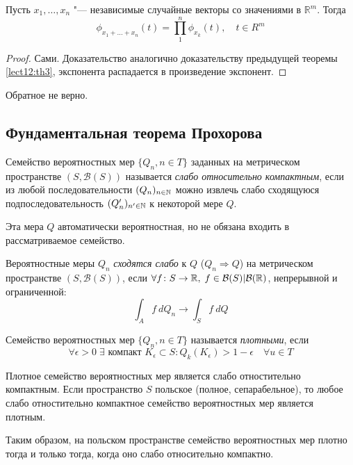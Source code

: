 \begin{lemma} \label{lect12:lem2}
    Пусть $x_1, \ldots, x_n$ "--- независимые случайные векторы со значениями в $\mathbb{R}^{m}$. Тогда
    $$\phi_{x_1 + \ldots + x_n} (t) = \prod_1^n \phi_{x_k}(t) , \quad t \in R^m$$
\end{lemma}
\begin{proof}
    Сами. Доказательство аналогично доказательству предыдущей теоремы \ref{lect12:th3}, экспонента распадается в произведение экспонент.
\end{proof}
\begin{nb}
    Обратное не верно.
\end{nb}
\subsection{Фундаментальная теорема Прохорова}
\begin{definition} \label{lect12:def2}
    Семейство вероятностных мер $\{Q_n, n \in T\}$ заданных на метрическом пространстве $(S, \mathcal{B}(S))$ называется \emph{слабо относительно компактным}, если из любой последовательности $(Q_n)_{n\in\mathbb{N}}$ можно извлечь слабо сходящуюся подпоследовательность $(Q_n')_{n'\in\mathbb{N}}$ к некоторой мере $Q$.
\end{definition}
\begin{nb}
    Эта мера $Q$ автоматически вероятностная, но не обязана входить в рассматриваемое семейство.
\end{nb}
\begin{definition} \label{lect12:def3}
    Вероятностные меры $Q_n$ \emph{сходятся слабо} к $Q$ ($Q_n \Rightarrow Q$) на метрическом пространстве $(S, \mathcal{B}(S))$, если
    $\forall f\colon S\to\mathbb{R}, \; f\in \mathcal{B}(S) | \mathcal{B}(\mathbb{R})$, непрерывной и ограниченной:
    $$\int_A f\: dQ_n \to \int_S f\:dQ$$
\end{definition}
\begin{definition} \label{lect12:def4}
    Семейство вероятностных мер $\{Q_n, n \in T\}$ называется \emph{плотными}, если 
    $$\forall \epsilon > 0 \; \exists \mbox{ компакт }K_\epsilon \subset S\colon Q_k(K_\epsilon) > 1- \epsilon \quad \forall u \in T$$
\end{definition}
\begin{theorem}[Прохоров] \label{lect12:th4}
    Плотное семейство вероятностных мер является слабо отностительно компактным. Если пространство $S$ польское (полное, сепарабельное), то любое слабо отностительно компактное семейство вероятностных мер является плотным.

    Таким образом, на польском пространстве семейство вероятностных мер плотно тогда и только тогда, когда оно слабо относительно компактно.
\end{theorem}
